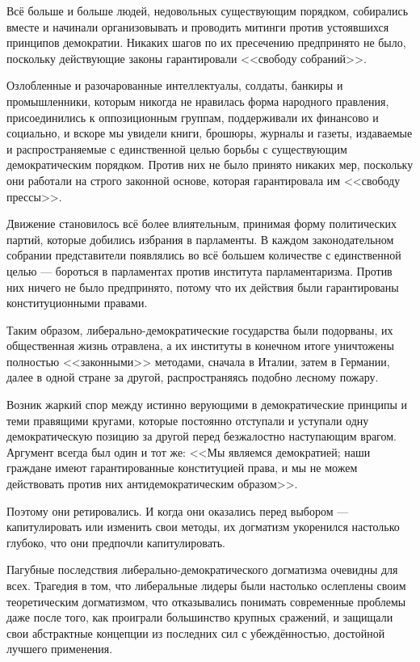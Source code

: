 Всё больше и больше людей, недовольных существующим порядком, собирались вместе и начинали организовывать и проводить митинги против устоявшихся принципов демократии. Никаких шагов по их пресечению предпринято не было, поскольку действующие законы гарантировали <<свободу собраний>>.

Озлобленные и разочарованные интеллектуалы, солдаты, банкиры и промышленники, которым никогда не нравилась форма народного правления, присоединились к оппозиционным группам, поддерживали их финансово и социально, и вскоре мы увидели книги, брошюры, журналы и газеты, издаваемые и распространяемые с единственной целью борьбы с существующим демократическим порядком. Против них не было принято никаких мер, поскольку они работали на строго законной основе, которая гарантировала им <<свободу прессы>>.

Движение становилось всё более влиятельным, принимая форму политических партий, которые добились избрания в парламенты. В каждом законодательном собрании представители появлялись во всё большем количестве с единственной целью — бороться в парламентах против института парламентаризма. Против них ничего не было предпринято, потому что их действия были гарантированы конституционными правами.

Таким образом, либерально-демократические государства были подорваны, их общественная жизнь отравлена, а их институты в конечном итоге уничтожены полностью <<законными>> методами, сначала в Италии, затем в Германии, далее в одной стране за другой, распространяясь подобно лесному пожару.

Возник жаркий спор между истинно верующими в демократические принципы и теми правящими кругами, которые постоянно отступали и уступали одну демократическую позицию за другой перед безжалостно наступающим врагом. Аргумент всегда был один и тот же: <<Мы являемся демократией; наши граждане имеют гарантированные конституцией права, и мы не можем действовать против них антидемократическим образом>>.

Поэтому они ретировались. И когда они оказались перед выбором — капитулировать или изменить свои методы, их догматизм укоренился настолько глубоко, что они предпочли капитулировать.

Пагубные последствия либерально-демократического догматизма очевидны для всех. Трагедия в том, что либеральные лидеры были настолько ослеплены своим теоретическим догматизмом, что отказывались понимать современные проблемы даже после того, как проиграли большинство крупных сражений, и защищали свои абстрактные концепции из последних сил с убеждённостью, достойной лучшего применения.

